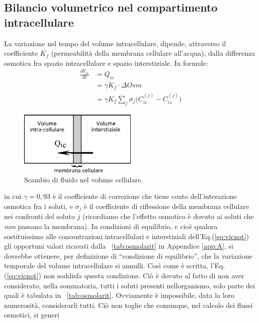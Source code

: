\subsection{Bilancio volumetrico nel compartimento intracellulare}
La variazione nel tempo del volume intracellulare, dipende, attraverso il coefficiente $K_f$ (permeabilità della membrana cellulare all'acqua), dalla differenza osmotica fra spazio intracellulare e spazio interstiziale. In formule:
\begin{equation}\label{eq:vicnot}
	\begin{split}
	\frac{dV_{ic}}{dt} &= Q_{ic}\\
										 &= \gamma K_f \cdot \Delta Osm \\
	                   &= \gamma K_f \sum_j{\sigma_j\biggl(C_{ic}^{(j)}-C_{is}^{(j)}\biggr)}
	\end{split}
\end{equation}
\begin{figure}[htb]
	\centering
		\includegraphics[width=0.5\textwidth]{immagini/vol_ic.eps}
				\caption{Scambio di fluido nel volume cellulare.}
\end{figure}
in cui $\gamma=0,93$ è il coefficiente di correzione che tiene conto dell'interazione osmotica fra i soluti, e $\sigma_j$ è il coefficiente di riflessione della membrana cellulare nei confronti del soluto $j$ (ricordiamo che l'effetto osmotico è dovuto ai soluti che \textit{non} passano la membrana).
In condizioni di equilibrio, e cioè qualora sostituissimo alle concentrazioni intracellulari e interstiziali dell'Eq.(\ref{eq:vicnot}) gli opportuni valori ricavati dalla \tablename~\ref{tab:osmolarit} in Appendice \ref{app:A}, si dovrebbe ottenere, per definizione di ``condizione di equilibrio'', che la variazione temporale del volume intracellulare si annulli. Così come è scritta, l'Eq.(\ref{eq:vicnot}) non soddisfa questa condizione. Ciò è dovuto al fatto di non aver considerato, nella sommatoria, tutti i soluti presenti nellorganismo, solo parte dei quali è tabulata in \tablename~\ref{tab:osmolarit}. Ovviamente è impossibile, data la loro numerosità, considerarli tutti. Ciò non toglie che comunque, nel calcolo dei flussi osmotici, si generi
